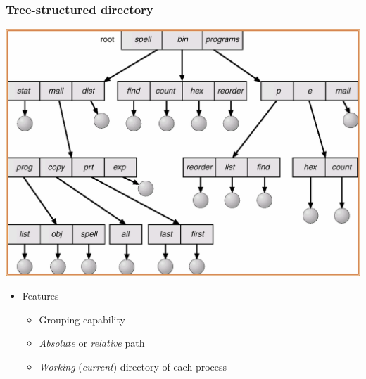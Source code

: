 \documentclass[CJKutf8,xcolor=pdftex,dvipsnames,table]{beamer}
\begin{document}
\begin{CJK*}{UTF8}{song}
  \begin{frame}
    \frametitle{Tree-structured directory} \pause
    \begin{center}
      \includegraphics[scale=.4]{v6f11-8} \pause
    \end{center}
    \begin{itemize}\parskip=0pt
    \item Features \pause
      \begin{itemize}\parskip=0pt
      \item Grouping capability \pause
      \item \emph{Absolute} or \emph{relative} path \pause
      \item \emph{Working} (\emph{current}) directory of each process
      \end{itemize}
    \end{itemize}
  \end{frame}


\end{CJK*}
\end{document}

